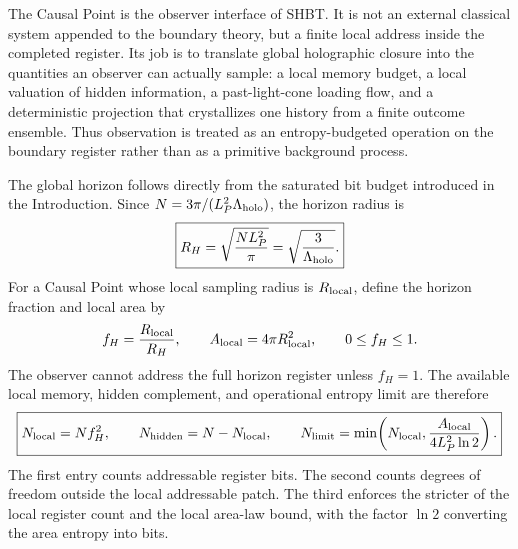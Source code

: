 \documentclass[11pt]{article}
\newcommand{\Lholo}{\Lambda_{\rm holo}}
\newcommand{\Nbits}{N}
\newcommand{\Lp}{L_P}
\begin{document}
The Causal Point is the observer interface of SHBT.  It is not an external
classical system appended to the boundary theory, but a finite local address
inside the completed register.  Its job is to translate global holographic
closure into the quantities an observer can actually sample: a local memory
budget, a local valuation of hidden information, a past-light-cone loading
flow, and a deterministic projection that crystallizes one history from a
finite outcome ensemble.  Thus observation is treated as an entropy-budgeted
operation on the boundary register rather than as a primitive background
process.

The global horizon follows directly from the saturated bit budget introduced in
the Introduction.  Since $\Nbits=3\pi/(\Lp^2\Lholo)$, the horizon radius is
\begin{equation}
\label{eq:section-seven-global-horizon}
 \boxed{
 R_H
 =
 \sqrt{\frac{\Nbits\Lp^2}{\pi}}
 =
 \sqrt{\frac{3}{\Lholo}}.
 }
\end{equation}
For a Causal Point whose local sampling radius is $R_{\rm local}$, define the
horizon fraction and local area by
\begin{equation}
\label{eq:section-seven-local-horizon-fraction}
 f_H
 =
 \frac{R_{\rm local}}{R_H},
 \qquad
 A_{\rm local}=4\pi R_{\rm local}^2,
 \qquad
 0\le f_H\le1.
\end{equation}
The observer cannot address the full horizon register unless $f_H=1$.  The
available local memory, hidden complement, and operational entropy limit are
therefore
\begin{equation}
\label{eq:section-seven-local-memory-budget}
 \boxed{
 N_{\rm local}
 =
 \Nbits f_H^2,
 \qquad
 N_{\rm hidden}
 =
 \Nbits-N_{\rm local},
 \qquad
 N_{\rm limit}
 =
 \min\!\left(
 N_{\rm local},
 \frac{A_{\rm local}}{4\Lp^2\ln2}
 \right).
 }
\end{equation}
The first entry counts addressable register bits.  The second counts degrees of
freedom outside the local addressable patch.  The third enforces the stricter
of the local register count and the local area-law bound, with the factor
$\ln2$ converting the area entropy into bits.
\end{document}

